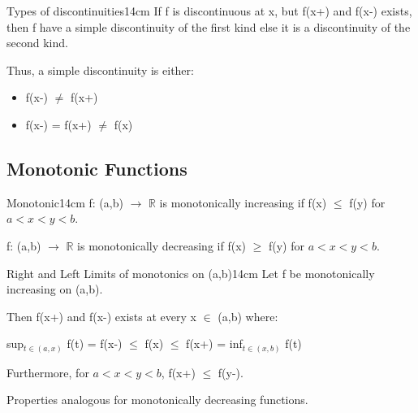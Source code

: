     \vspace{0.3cm}



    \begin{definition}{Types of discontinuities}{14cm}
        \small
        If f is discontinuous at x, but f(x+) and f(x-) exists,
        then f have a simple discontinuity of the first kind else
        it is a discontinuity of the second kind.

        Thus, a simple discontinuity is either:

        \begin{itemize}[leftmargin=1cm, itemsep=0.1cm]
            \item f(x-) $\not = $ f(x+)
            
            \item f(x-) = f(x+) $\not =$ f(x) 
        \end{itemize}
    \end{definition}

    \vspace{0.3cm}





\subsection{ Monotonic Functions }

    \begin{definition}{Monotonic}{14cm}
        \small
        f: (a,b) $\rightarrow$ $\mathbb{R}$ is monotonically increasing
        if f(x) $\leq$ f(y) for $a < x < y < b$.

        f: (a,b) $\rightarrow$ $\mathbb{R}$ is monotonically decreasing
        if f(x) $\geq$ f(y) for $a < x < y < b$.        
    \end{definition}

    \vspace{0.5cm}



    \begin{wtheorem}{Right and Left Limits of monotonics on (a,b)}{14cm}
        Let f be monotonically increasing on (a,b).

        Then f(x+) and f(x-) exists at every x $\in$ (a,b) where:

        \hspace{1cm}
        sup$_{t \in (a,x)}$ f(t)
        = f(x-)
        $\leq$ f(x)
        $\leq$ f(x+)
        = inf$_{t \in (x,b)}$ f(t)

        Furthermore, for $a < x < y < b$, f(x+) $\leq$ f(y-).

        Properties analogous for monotonically decreasing functions.
    \end{wtheorem}

